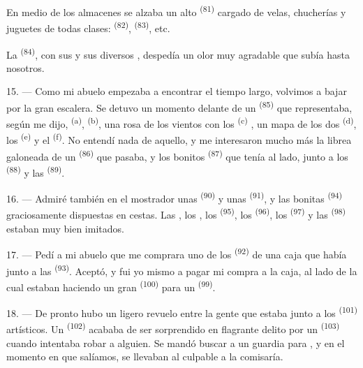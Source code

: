 En medio de los almacenes se alzaba un alto 
\textsuperscript{(81)} cargado de velas, chucherías y juguetes de todas clases:
 \textsuperscript{(82)},  \textsuperscript{(83)},
etc.

La  \textsuperscript{(84)}, con sus  y sus
diversos , despedía un olor muy agradable que subía hasta
nosotros.

\VUsaut{3.4mm}
\VUsaut{2.8mm}

15. --- Como mi abuelo empezaba a encontrar el tiempo largo, volvimos a
bajar por la gran escalera. Se detuvo un momento delante de un
 \textsuperscript{(85)} que representaba, según me dijo,
 \textsuperscript{(a)}, 
\textsuperscript{(b)}, una rosa de los vientos con los  \textsuperscript{(c)} , un mapa de los
dos  \textsuperscript{(d)}, los  \textsuperscript{(e)} y
el  \textsuperscript{(f)}. No entendí nada de aquello, y me
interesaron mucho más la librea galoneada de un 
\textsuperscript{(86)} que pasaba, y los bonitos  \textsuperscript{(87)} que
tenía al lado, junto a los  \textsuperscript{(88)} y las
 \textsuperscript{(89)}.

16. --- Admiré también en el mostrador unas  \textsuperscript{(90)} y
unas  \textsuperscript{(91)}, y las bonitas
 \textsuperscript{(94)} graciosamente dispuestas en
cestas. Las , los , los 
\textsuperscript{(95)}, los  \textsuperscript{(96)}, los 
\textsuperscript{(97)} y las  \textsuperscript{(98)} estaban muy bien
imitados.

\VUsaut{4.4mm}
\VUsaut{2.8mm}

17. --- Pedí a mi abuelo que me comprara uno de los
 \textsuperscript{(92)} de una caja que había junto a las
 \textsuperscript{(93)}. Aceptó, y fui yo mismo a pagar mi compra
a la caja, al lado de la cual estaban haciendo un gran 
\textsuperscript{(100)} para un  \textsuperscript{(99)}.

18. --- De pronto hubo un ligero revuelo entre la gente que estaba junto a
los  \textsuperscript{(101)} artísticos. Un 
\textsuperscript{(102)} acababa de ser sorprendido en flagrante delito por un
 \textsuperscript{(103)} cuando intentaba robar a
alguien. Se mandó buscar a un guardia para , y en el
momento en que salíamos, se llevaban al culpable a la comisaría.
\VUsaut{6.0mm}
\VUfilet{22mm}
